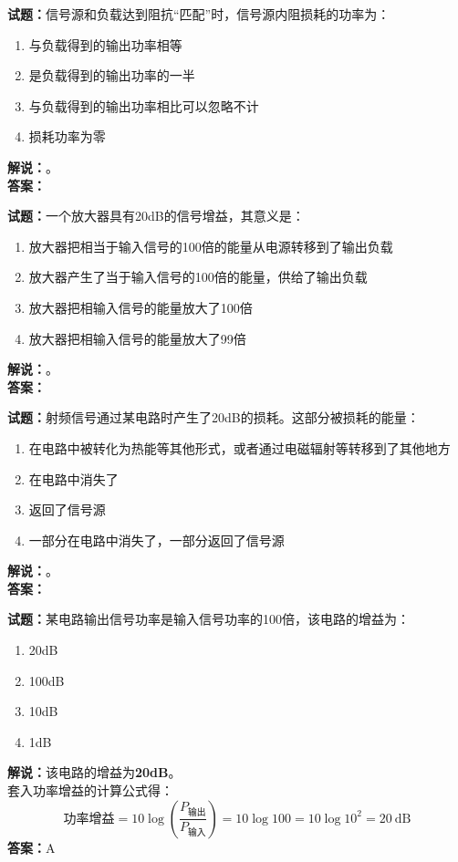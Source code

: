\documentclass{ctexbook}
\begin{document}
\bigskip




\noindent\textbf{试题：}信号源和负载达到阻抗“匹配”时，信号源内阻损耗的功率为：
\begin{enumerate}[leftmargin=3em]
\item 与负载得到的输出功率相等
\item 是负载得到的输出功率的一半
\item 与负载得到的输出功率相比可以忽略不计
\item 损耗功率为零
\end{enumerate}
\noindent\textbf{解说：}\textbf{}。\\\noindent\textbf{答案：}

\bigskip




\noindent\textbf{试题：}一个放大器具有20dB的信号增益，其意义是：
\begin{enumerate}[leftmargin=3em]
\item 放大器把相当于输入信号的100倍的能量从电源转移到了输出负载
\item 放大器产生了当于输入信号的100倍的能量，供给了输出负载
\item 放大器把相输入信号的能量放大了100倍
\item 放大器把相输入信号的能量放大了99倍
\end{enumerate}
\noindent\textbf{解说：}\textbf{}。\\\noindent\textbf{答案：}

\bigskip




\noindent\textbf{试题：}射频信号通过某电路时产生了20dB的损耗。这部分被损耗的能量：
\begin{enumerate}[leftmargin=3em]
\item 在电路中被转化为热能等其他形式，或者通过电磁辐射等转移到了其他地方
\item 在电路中消失了
\item 返回了信号源
\item 一部分在电路中消失了，一部分返回了信号源
\end{enumerate}
\noindent\textbf{解说：}\textbf{}。\\\noindent\textbf{答案：}

\bigskip




\noindent\textbf{试题：}某电路输出信号功率是输入信号功率的100倍，该电路的增益为：
\begin{enumerate}[leftmargin=3em]
\item 20dB
\item 100dB
\item 10dB
\item 1dB
\end{enumerate}
\noindent\textbf{解说：}该电路的增益为\textbf{20dB}。\\
套入功率增益的计算公式得：
$$\mbox{功率增益}=10 \log \left( {\frac{P_{ \mbox{输出} }}{P_{ \mbox{输入} }}} \right)=10 \log 100 = 10 \log 10^2 = 20 \ \mathrm{dB}$$
\noindent\textbf{答案：}A
\end{document}

